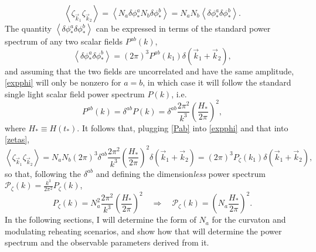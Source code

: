\documentclass[12pt]{article}
\begin{document}
\begin{equation}\label{zetas}
    \left<\zeta_{\vec{k}_1}\zeta_{\vec{k}_2}\right>=\left<N_a\delta\phi^a_*N_b\delta\phi^b_*\right>=N_aN_b\left<\delta\phi^a_*\delta\phi^b_*\right>.
\end{equation}
The quantity $\left<\delta\phi^a_*\delta\phi^b_*\right>$ can be expressed in terms of the standard power spectrum of any two scalar fields $P^{ab}(k)$, 
\begin{equation}\label{expphi}
\left<\delta\phi^a_*\delta\phi^b_*\right>=(2\pi)^3P^{ab}(k_1)\delta(\vec{k}_1+\vec{k}_2),
\end{equation}
and assuming that the two fields are uncorrelated and have the same amplitude, \eqref{expphi} will only be nonzero for $a=b$, in which case it will follow the standard single light scalar field power spectrum $P(k)$, i.e.
\begin{equation}\label{Pab}
    P^{ab}(k)=\delta^{ab}P(k)=\delta^{ab}\frac{2\pi^2}{k^3}\left(\frac{H_*}{2\pi}\right)^2,
\end{equation}
where $H_*\equiv H(t_*)$. It follows that, plugging \eqref{Pab} into \eqref{expphi} and that into \eqref{zetas},
\begin{equation}
     \left<\zeta_{\vec{k}_1}\zeta_{\vec{k}_2}\right>=N_aN_b(2\pi)^3\delta^{ab}\frac{2\pi^2}{k^3}\left(\frac{H_*}{2\pi}\right)^2\delta(\vec{k}_1+\vec{k}_2)=(2\pi)^3P_\zeta(k_1)\delta(\vec{k}_1+\vec{k}_2),
\end{equation}
so that, following the $\delta^{ab}$ and defining the dimension\textit{less} power spectrum $\mathcal{P}_\zeta(k)=\frac{k^3}{2\pi^2}P_\zeta(k)$,
\begin{equation}\label{Presult}
    P_\zeta(k)=N_a^2\frac{2\pi^2}{k^3}\left(\frac{H_*}{2\pi}\right)^2 \quad \Rightarrow \quad \boxed{\mathcal{P}_\zeta(k)=\left(N_a\frac{H_*}{2\pi}\right)^2}.
\end{equation}
In the following sections, I will determine the form of $N_a$ for the curvaton and modulating reheating scenarios, and show how that will determine the power spectrum and the observable parameters derived from it.
\end{document}
